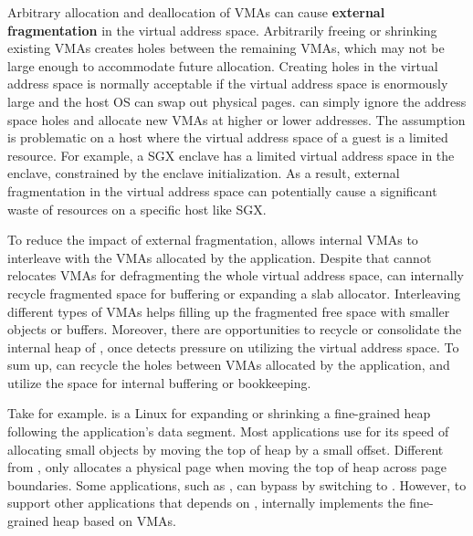 Arbitrary allocation and deallocation of VMAs can cause {\bf external fragmentation} in the virtual address space.
Arbitrarily freeing or shrinking existing VMAs
creates holes between the remaining VMAs, which may not be large enough
to accommodate future allocation.
Creating holes in the virtual address space
is normally acceptable if the virtual address space is enormously large and the host OS can swap out physical pages.
\thelibos{} can simply ignore the address space holes and
allocate new VMAs at higher or lower addresses. 
The assumption is problematic on a host where the virtual address space of
a guest is a limited resource.
For example, a SGX enclave has a limited virtual address space in the enclave, constrained by the enclave initialization.
As a result, external fragmentation in the virtual address space
can potentially cause a significant waste of resources on a specific host like SGX.


To reduce the impact of external fragmentation, \thelibos{} allows internal VMAs to interleave with the VMAs allocated by the application.
Despite that \thelibos{} cannot relocates VMAs
for defragmenting the whole virtual address space,
\thelibos{} can internally recycle fragmented space for buffering or expanding a slab allocator.
Interleaving different types of VMAs
helps filling up the fragmented free space
with smaller objects or buffers.
Moreover, there are opportunities to recycle or consolidate the internal heap of \thelibos{},
once \thelibos{} detects pressure on utilizing the virtual address space.
To sum up, \thelibos{} can recycle the holes between VMAs allocated by the application, and utilize the space for internal buffering or bookkeeping.









Take  for example.
 is a Linux \linuxapi{} for expanding or shrinking a fine-grained heap following the application's data segment.
Most applications 
use  
for its speed of allocating 
small objects by moving the top of heap by a small offset.
Different from ,
 only allocates a physical page
when moving the top of heap across page boundaries.
Some applications, such as \gcc{}, can bypass  by switching to .
However, to support other applications that depends on ,
\thelibos{} internally implements the fine-grained heap
based on VMAs.



